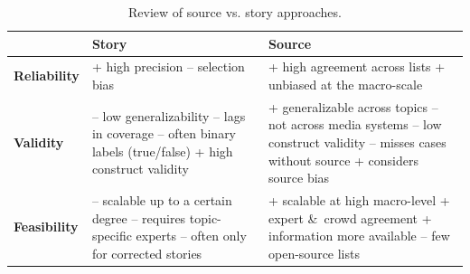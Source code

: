 \begin{table}[H]
\centering
\caption{Review of source vs. story approaches.}
\label{table:review}
\begin{tabularx}{\textwidth}{ | l | X | X | }
\toprule
        &  \textbf{Story} &  \textbf{Source}           \\
\midrule
\textbf{Reliability} &  
+ high precision \newline
– selection bias
&
+ high agreement across lists \newline
+ unbiased at the macro-scale
\\
 \hline
\textbf{Validity}    &  
– low generalizability \newline
– lags in coverage \newline
– often binary labels (true/false) \newline
+ high construct validity
 & 
+ generalizable across topics \newline
– not across media systems \newline
– low construct validity \newline
– misses cases without source  \newline
+ considers source bias
\\
 \hline
\textbf{Feasibility} &  
– scalable up to a certain degree \newline
– requires topic-specific experts \newline
– often only for corrected stories
& 
+ scalable at high macro-level \newline
+ expert \&\ crowd agreement \newline
+ information more available \newline
– few open-source lists
\\
\bottomrule
\end{tabularx}
\end{table}